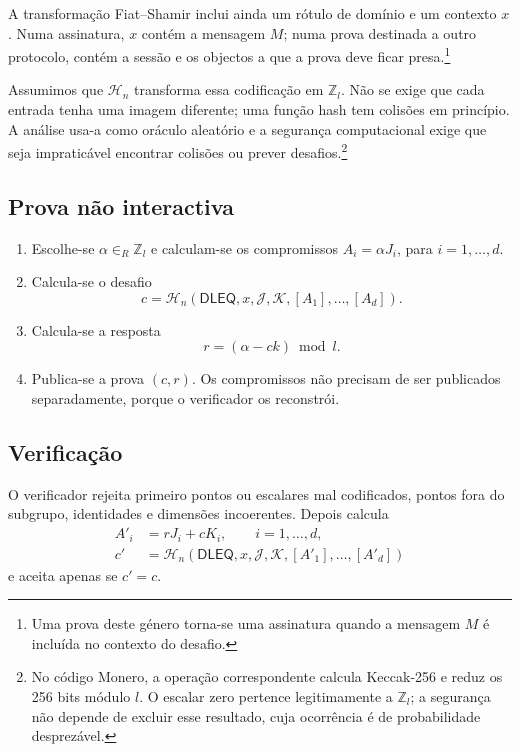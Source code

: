 A transformação Fiat--Shamir inclui ainda um rótulo de domínio e um contexto
\(x\). Numa assinatura, \(x\) contém a mensagem \(M\); numa prova
destinada a outro protocolo, contém a sessão e os objectos a que a prova deve
ficar presa.\footnote{Uma prova deste género torna-se uma assinatura quando a
mensagem \(M\) é incluída no contexto do desafio.}

Assumimos que \(\mathcal H_n\) transforma essa codificação em
\(\mathbb Z_l\). Não se exige que cada entrada tenha uma imagem diferente;
uma função hash tem colisões em princípio. A análise usa-a como oráculo
aleatório e a segurança computacional exige que seja impraticável encontrar
colisões ou prever desafios.\footnote{No código Monero, a operação
correspondente calcula Keccak-256 e reduz os 256 bits módulo \(l\). O escalar
zero pertence legitimamente a \(\mathbb Z_l\); a segurança não depende de
excluir esse resultado, cuja ocorrência é de probabilidade desprezável.}

\subsection*{Prova não interactiva}

\begin{enumerate}
    \item Escolhe-se \(\alpha\in_R\mathbb Z_l\) e calculam-se os compromissos
    \(A_i=\alpha J_i\), para \(i=1,\ldots,d\).
    \item Calcula-se o desafio
    \[
    c=\mathcal H_n(\mathsf{DLEQ},x,
       \mathcal J,\mathcal K,[A_1],\ldots,[A_d]).
    \]
    \item Calcula-se a resposta
    \[
    r=(\alpha-ck)\bmod l.
    \]
    \item Publica-se a prova \((c,r)\). Os compromissos não precisam de ser
    publicados separadamente, porque o verificador os reconstrói.
\end{enumerate}

\subsection*{Verificação}

O verificador rejeita primeiro pontos ou escalares mal codificados, pontos
fora do subgrupo, identidades e dimensões incoerentes. Depois calcula
\begin{align*}
A'_i &= rJ_i+cK_i,\qquad i=1,\ldots,d,\\
c' &= \mathcal H_n(\mathsf{DLEQ},x,
       \mathcal J,\mathcal K,[A'_1],\ldots,[A'_d])
\end{align*}
e aceita apenas se \(c'=c\).

